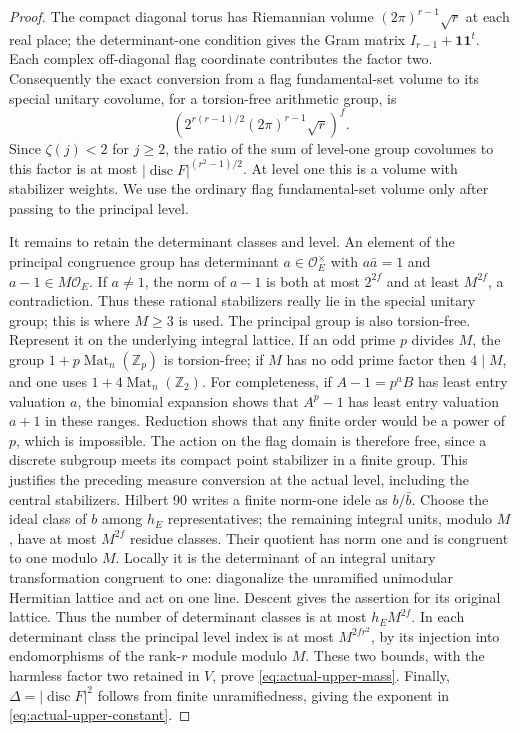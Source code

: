 \begin{proof}
The compact diagonal torus has Riemannian volume
$(2\pi)^{r-1}\sqrt r$ at each real place; the determinant-one
condition gives the Gram matrix
$I_{r-1}+\mathbf1\mathbf1^t$.  Each complex off-diagonal flag
coordinate contributes the factor two.  Consequently the exact
conversion from a flag fundamental-set volume to its special
unitary covolume, for a torsion-free arithmetic group, is
\[
       \left(2^{r(r-1)/2}(2\pi)^{r-1}\sqrt r\right)^f.
\]
Since $\zeta(j)<2$ for $j\ge2$, the ratio of the sum of
level-one group covolumes to this factor is at most
$|\operatorname{disc}F|^{(r^2-1)/2}$.  At level one this is a
volume with stabilizer weights.  We use the ordinary flag
fundamental-set volume only after passing to the principal level.

It remains to retain the determinant classes and level.
An element of the principal congruence group has determinant
$a\in\mathcal O_E^\times$ with $a\bar a=1$ and
$a-1\in M\mathcal O_E$.  If $a\ne1$, the norm of $a-1$ is
both at most $2^{2f}$ and at least $M^{2f}$, a contradiction.
Thus these rational stabilizers really lie in the special unitary
group; this is where $M\ge3$ is used.
The principal group is also torsion-free.  Represent it on the
underlying integral lattice.  If an odd prime $p$ divides $M$,
the group $1+p\operatorname{Mat}_n(\mathbb Z_p)$ is torsion-free;
if $M$ has no odd prime factor then $4\mid M$, and one uses
$1+4\operatorname{Mat}_n(\mathbb Z_2)$.
For completeness, if $A-1=p^aB$ has least entry valuation $a$,
the binomial expansion shows that $A^p-1$ has least entry
valuation $a+1$ in these ranges.  Reduction shows that any
finite order would be a power of $p$, which is impossible.
The action on the flag domain is therefore free, since a
discrete subgroup meets its compact point stabilizer in a
finite group.  This justifies the preceding measure conversion
at the actual level, including the central stabilizers.
Hilbert 90 writes a finite norm-one idele as $b/\bar b$.
Choose the ideal class of $b$ among $h_E$ representatives; the
remaining integral units, modulo $M$, have at most $M^{2f}$
residue classes.  Their quotient has norm one and is congruent
to one modulo $M$.  Locally it is the determinant of an integral
unitary transformation congruent to one: diagonalize the
unramified unimodular Hermitian lattice and act on one line.
Descent gives the assertion for its original lattice.
Thus the number of determinant classes is at most
$h_E M^{2f}$.  In each determinant class the principal level
index is at most $M^{2fr^2}$, by its injection into endomorphisms
of the rank-$r$ module modulo $M$.  These two bounds, with the
harmless factor two retained in $V$, prove
\eqref{eq:actual-upper-mass}.  Finally,
$\Delta=|\operatorname{disc}F|^2$ follows from finite
unramifiedness, giving the exponent in
\eqref{eq:actual-upper-constant}.


\end{proof}
